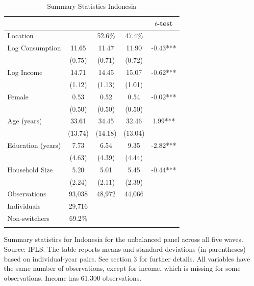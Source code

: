 \begin{table}[htbp] \centering \caption{Summary Statistics Indonesia}\label{tab:summary_stats_IDN_unb_3waves} \begin{threeparttable} \begin{tabular}{l cccc} \toprule
 &  &  &  & $t$-test \\
\midrule
Location &  &   52.6\% &   47.4\% &  \\  \addlinespace \addlinespace
Log Consumption & 11.65 & 11.47 & 11.90 & -0.43*** \\
 & (0.75) & (0.71) & (0.72) &  \\  \addlinespace
Log Income & 14.71 & 14.45 & 15.07 & -0.62*** \\
 & (1.12) & (1.13) & (1.01) &  \\  \addlinespace
Female & 0.53 & 0.52 & 0.54 & -0.02*** \\
 & (0.50) & (0.50) & (0.50) &  \\  \addlinespace
Age (years) & 33.61 & 34.45 & 32.46 & 1.99*** \\
 & (13.74) & (14.18) & (13.04) &  \\  \addlinespace
Education (years) & 7.73 & 6.54 & 9.35 & -2.82*** \\
 & (4.63) & (4.39) & (4.44) &  \\  \addlinespace
Household Size & 5.20 & 5.01 & 5.45 & -0.44*** \\
 & (2.24) & (2.11) & (2.39) &  \\  \addlinespace


\cmidrule{2-5}
Observations & 93,038 & 48,972 & 44,066 &  \\  \addlinespace
Individuals & 29,716 &  &  &  \\
Non-switchers &   69.2\% &  &  &  \\  \addlinespace
\bottomrule \end{tabular} \begin{tablenotes}[flushleft] \footnotesize \item{Summary statistics for Indonesia for the unbalanced panel across all five waves. Source: IFLS. The table reports means and standard deviations (in parentheses) based on individual-year pairs. See section 3 for further details. All variables have the same number of observations, except for income, which is missing for some observations. Income has 61,300 observations.} \end{tablenotes} \end{threeparttable} \end{table}